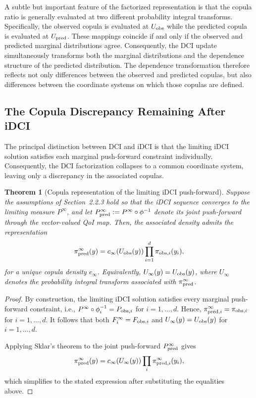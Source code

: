 \documentclass{article}
\newtheorem{theorem}{Theorem}[section]
\begin{document}
A subtle but important feature of the factorized representation is that the copula ratio is generally evaluated at two different probability integral transforms.
Specifically, the observed copula is evaluated at $U_{\rm obs}$ while the predicted copula is evaluated at $U_{\rm pred}$.
These mappings coincide if and only if the observed and predicted marginal distributions agree.
Consequently, the DCI update simultaneously transforms both the marginal distributions and the dependence structure of the predicted distribution.
The dependence transformation therefore reflects not only differences between the observed and predicted copulas, but also differences between the coordinate systems on which those copulas are defined.

\subsection{The Copula Discrepancy Remaining After iDCI}

The principal distinction between DCI and iDCI is that the limiting iDCI solution satisfies each marginal push-forward constraint individually.
Consequently, the DCI factorization collapses to a common coordinate system, leaving only a discrepancy in the associated copulas.

\begin{theorem}[Copula representation of the limiting iDCI push-forward]\label{thm:copula+iDCI}
Suppose the assumptions of Section~2.2.3 hold so that the iDCI sequence converges to the limiting measure
$P^\infty$, and let $P^\infty_{\rm pred}:=P^\infty\circ\phi^{-1}$
denote its joint push-forward through the vector-valued QoI map.
Then, the associated density admits the representation
\[
\pi^\infty_{\rm pred}(y)
=
c_\infty(U_{\rm obs}(y))
\prod_{i=1}^{d}
\pi_{{\rm obs},i}(y_i),
\]
for a unique copula density
$c_\infty$.
Equivalently, $U_\infty(y)=U_{\rm obs}(y)$, where $U_\infty$
denotes the probability integral transform associated with
$\pi^\infty_{\rm pred}$.

\end{theorem}

\begin{proof}
By construction, the limiting iDCI solution satisfies every marginal push-forward constraint, i.e., $P^\infty\circ\phi_i^{-1}=P_{{\rm obs},i}$ for $i=1,\ldots,d$.
Hence, $\pi^\infty_{{\rm pred},i}=
\pi_{{\rm obs},i}$ for $i=1,\ldots,d$.
It follows that both $F^\infty_i=
F_{{\rm obs},i}$ and $U_\infty(y)=
U_{\rm obs}(y)$ for $i=1,\ldots, d$.

Applying Sklar's theorem to the joint push-forward
$P^\infty_{\rm pred}$
gives
\[
\pi^\infty_{\rm pred}(y)
=
c_\infty(U_\infty(y))
\prod_i
\pi^\infty_{{\rm pred},i}(y_i),
\]
which simplifies to the stated expression after substituting the equalities above.
\end{proof}
\end{document}
